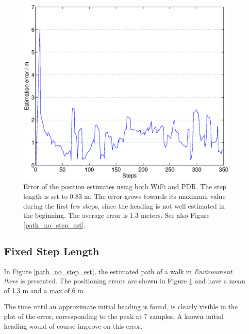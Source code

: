 \documentclass{LTHthesis}
\begin{document}
\begin{figure}[!hbt]

\includegraphics[width=1\textwidth ]{images/sensor_fused/error_no_step_est}
\caption{Error of the position estimates using both WiFi and PDR. The step length is set to 0.83 m. The error grows towards its maximum value during the first few steps, since the heading is not well estimated in the beginning. The average error is 1.3 meters. See also Figure \ref{path_no_step_est}.}\label{error_no_step_est}
\end{figure}
%

%
\subsection{Fixed Step Length}
In Figure \ref{path_no_step_est}, the estimated path of a walk in \emph{Environment three} is presented. The positioning errors are shown in Figure \ref{error_no_step_est} and have a mean of 1.3 m and a max of 6 m. 
%

The time until an approximate initial heading is found, is clearly visible in the plot of the error, corresponding to the peak at 7 samples. A known initial heading would of course improve on this error. 
\end{document}
